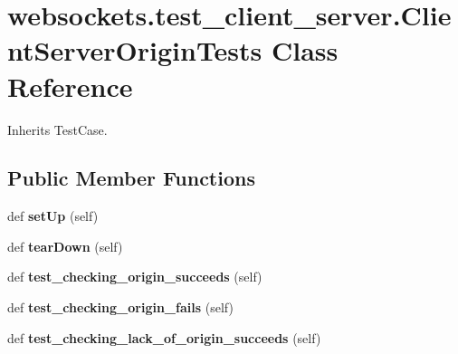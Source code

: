 \hypertarget{classwebsockets_1_1test__client__server_1_1_client_server_origin_tests}{}\section{websockets.\+test\+\_\+client\+\_\+server.\+Client\+Server\+Origin\+Tests Class Reference}
\label{classwebsockets_1_1test__client__server_1_1_client_server_origin_tests}


Inherits Test\+Case.

\subsection*{Public Member Functions}
\begin{DoxyCompactItemize}
\item 
\mbox{\label{classwebsockets_1_1test__client__server_1_1_client_server_origin_tests_aec7c0492d9c7d78b0e13dfdebd05f561}} 
def {\bfseries set\+Up} (self)
\item 
\mbox{\label{classwebsockets_1_1test__client__server_1_1_client_server_origin_tests_ae5192593769c48ee36f14bfcd7745557}} 
def {\bfseries tear\+Down} (self)
\item 
\mbox{\label{classwebsockets_1_1test__client__server_1_1_client_server_origin_tests_a89ebcbddef1df2594a9699e9c858f85c}} 
def {\bfseries test\+\_\+checking\+\_\+origin\+\_\+succeeds} (self)
\item 
\mbox{\label{classwebsockets_1_1test__client__server_1_1_client_server_origin_tests_ae6a7b551a62ff9d33a8e481b104a9252}} 
def {\bfseries test\+\_\+checking\+\_\+origin\+\_\+fails} (self)
\item 
\mbox{\label{classwebsockets_1_1test__client__server_1_1_client_server_origin_tests_aa6bf0f4af4e86b53750bedc88c0c24b7}} 
def {\bfseries test\+\_\+checking\+\_\+lack\+\_\+of\+\_\+origin\+\_\+succeeds} (self)
\end{DoxyCompactItemize}
